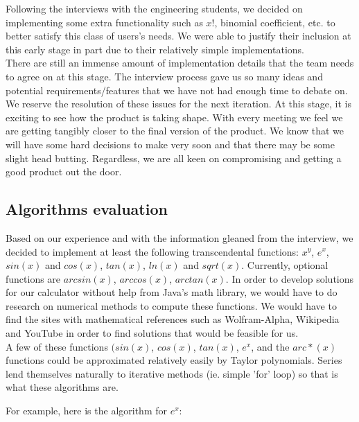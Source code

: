 \documentclass[a4paper]{article}
\begin{document}
Following the interviews with the engineering students, we decided on implementing some extra functionality such as $x!$, binomial coefficient, etc. to better satisfy this class of users's needs. We were able to justify their inclusion at this early stage in part due to their relatively simple implementations. \\

There are still an immense amount of implementation details that the team needs to agree on at this stage. The interview process gave us so many ideas and potential requirements/features that we have not had enough time to debate on. We reserve the resolution of these issues for the next iteration. At this stage, it is exciting to see how the product is taking shape. With every meeting we feel we are getting tangibly closer to the final version of the product. We know that we will have some hard decisions to make very soon and that there may be some slight head butting. Regardless, we are all keen on compromising and getting a good product out the door.

\subsection{Algorithms evaluation}

Based on our experience and with the information gleaned from the interview, we decided to implement at least the following transcendental functions: $x^y$, $e^x$, $sin(x)$ and $cos(x)$, $tan(x)$, $ln(x)$ and $sqrt(x)$. Currently, optional functions are $arcsin(x)$, $arccos(x)$, $arctan(x)$. In order to develop solutions for our calculator without help from Java’s math library, we would have to do research on numerical methods to compute these functions. We would have to find the sites with mathematical references such as Wolfram-Alpha, Wikipedia and YouTube in order to find solutions that would be feasible for us. \\

A few of these functions $(sin(x)$, $cos(x)$, $tan(x)$, $e^x$, and the $arc*(x)$ functions could be approximated relatively easily by Taylor polynomials. Series lend themselves naturally to iterative methods (ie. simple 'for' loop) so that is what these algorithms are.
\bigskip

For example, here is the algorithm for $e^x$:
\end{document}
